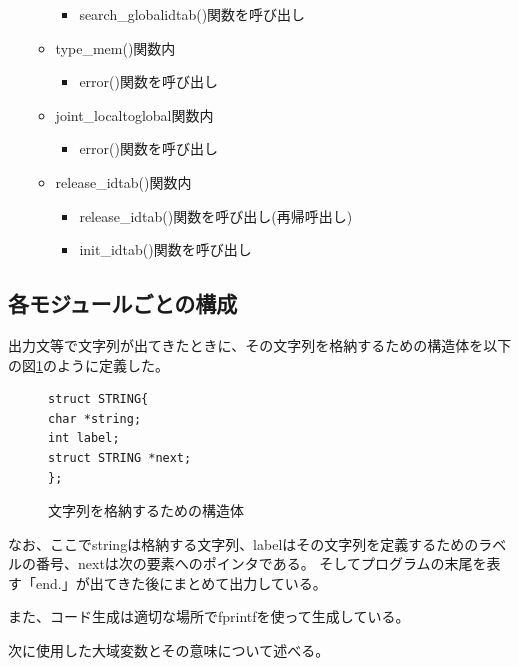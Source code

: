 \documentclass{jarticle}
\begin{document}
\begin{itemize}
\begin{itemize}
\begin{itemize}
      \item search\_globalidtab()関数を呼び出し
    \end{itemize}
    \item type\_mem()関数内
    \begin{itemize}
      \item error()関数を呼び出し
    \end{itemize}
    \item joint\_localtoglobal関数内
    \begin{itemize}
      \item error()関数を呼び出し
    \end{itemize}
    \item release\_idtab()関数内
    \begin{itemize}
      \item release\_idtab()関数を呼び出し(再帰呼出し)
      \item init\_idtab()関数を呼び出し
    \end{itemize}
  \end{itemize}
\end{itemize}
\subsection{各モジュールごとの構成}
出力文等で文字列が出てきたときに、その文字列を格納するための構造体を以下の図\ref{code:string}のように定義した。
\begin{figure}[H]
\begin{center}
\begin{lstlisting}
struct STRING{
char *string;
int label;
struct STRING *next;
};
\end{lstlisting}
\caption{文字列を格納するための構造体}
\label{code:string}
\end{center}
\end{figure}
なお、ここでstringは格納する文字列、labelはその文字列を定義するためのラベルの番号、nextは次の要素へのポインタである。
そしてプログラムの末尾を表す「end.」が出てきた後にまとめて出力している。

また、コード生成は適切な場所でfprintfを使って生成している。

次に使用した大域変数とその意味について述べる。
\end{document}
